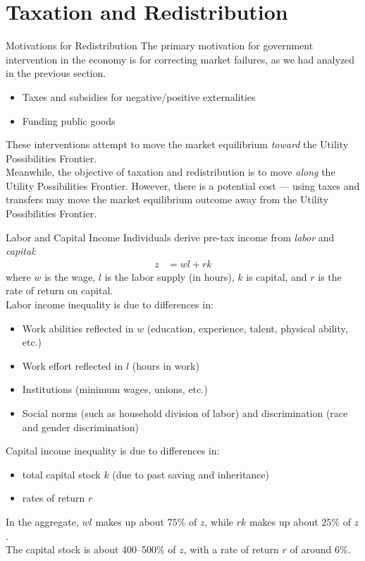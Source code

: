\documentclass[10pt]{extarticle}
\begin{document}
  \section*{Taxation and Redistribution}%
  \begin{problem}{Motivations for Redistribution}
    The primary motivation for government intervention in the economy is for correcting market failures, as we had analyzed in the previous section.
    \begin{itemize}
      \item Taxes and subsidies for negative/positive externalities
      \item Funding public goods
    \end{itemize}
    These interventions attempt to move the market equilibrium \textit{toward} the Utility Possibilities Frontier.\\

    Meanwhile, the objective of taxation and redistribution is to move \textit{along} the Utility Possibilities Frontier. However, there is a potential cost --- using taxes and transfers may move the market equilibrium outcome away from the Utility Possibilities Frontier.
  \end{problem}
  \begin{problem}{Labor and Capital Income}
    Individuals derive pre-tax income from \textit{labor} and \textit{capital}:
    \begin{align*}
      z &= wl + rk
    \end{align*}
    where $w$ is the wage, $l$ is the labor supply (in hours), $k$ is capital, and $r$ is the rate of return on capital.\\

    Labor income inequality is due to differences in:
    \begin{itemize}
      \item Work abilities reflected in $w$ (education, experience, talent, physical ability, etc.)
      \item Work effort reflected in $l$ (hours in work)
      \item Institutions (minimum wages, unions, etc.)
      \item Social norms (such as household division of labor) and discrimination (race and gender discrimination)
    \end{itemize}
    Capital income inequality is due to differences in:
    \begin{itemize}
      \item total capital stock $k$ (due to past saving and inheritance)
      \item rates of return $r$
    \end{itemize}
    In the aggregate, $wl$ makes up about $75\%$ of $z$, while $rk$ makes up about $25\%$ of $z$.\\

    The capital stock is about 400--500\% of $z$, with a rate of return $r$ of around $6\%$.
  \end{problem}
\end{document}
